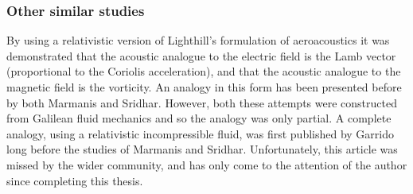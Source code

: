 




\subsubsection{Other similar studies}

By using a relativistic version of Lighthill's formulation of aeroacoustics it was demonstrated 
that the acoustic analogue to the electric field is the Lamb vector (proportional to the Coriolis acceleration),
and that the acoustic analogue to the magnetic field is the vorticity.
An analogy in this form has been presented before by both Marmanis\cite{Marmanis2000} and Sridhar\cite{Marmanis2000,Sridhar1998}.
However, both these attempts were constructed from Galilean fluid mechanics and so the analogy was only partial.
A complete  analogy, using a relativistic incompressible fluid, was first published by Garrido\cite{Garrido1982} long before the studies of Marmanis and Sridhar.  
Unfortunately, this article was missed by the wider community, 
and has only come to the attention of the author since completing this thesis.



